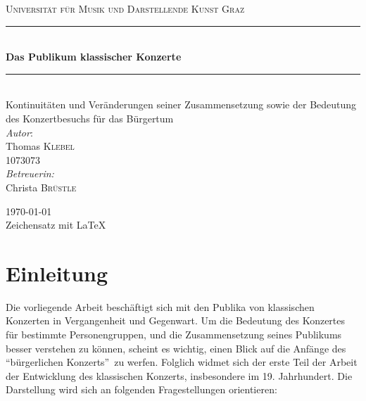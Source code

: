 \documentclass[a4paper, german, oneside]{scrbook}
\date{\displaydate{date}}
\begin{document}
	\begin{titlepage}
	
		\begin{center}



		\textsc{\LARGE Universität für Musik und Darstellende Kunst Graz}\\[1.5cm]



		\newcommand{\HRule}{\rule{\linewidth}{0.5mm}}
		\HRule \\[0.4cm]
		{ \huge \bfseries Das Publikum klassischer Konzerte}\\[0.4cm]

		\HRule \\[0.5cm] %


		\Large Kontinuitäten und Veränderungen seiner Zusammensetzung sowie der Bedeutung des Konzertbesuchs für das Bürgertum\\[2cm]

		\Large \emph{Autor}:\\
		Thomas \textsc{Klebel}\\[0.1cm]
		\large 1073073\\[1cm]

		\Large \emph{Betreuerin:}\\
		Christa \textsc{Brüstle}\\[1cm]



		\vfill

		\Large{\today}\\[1cm]
		\normalsize{Zeichensatz mit \LaTeX}
		

		\end{center}

	\end{titlepage}

	
\clearpage
\setcounter{page}{1}

\tableofcontents

\chapter*{Einleitung}
Die vorliegende Arbeit beschäftigt sich mit den Publika von klassischen Konzerten in Vergangenheit und Gegenwart. Um die Bedeutung des Konzertes für bestimmte Personengruppen, und die Zusammensetzung seines Publikums besser verstehen zu können, scheint es wichtig, einen Blick auf die Anfänge des \enquote{bürgerlichen Konzerts} zu werfen. Folglich widmet sich der erste Teil der Arbeit der Entwicklung des klassischen Konzerts, insbesondere im 19. Jahrhundert. Die Darstellung wird sich an folgenden Fragestellungen orientieren:
\end{document}
